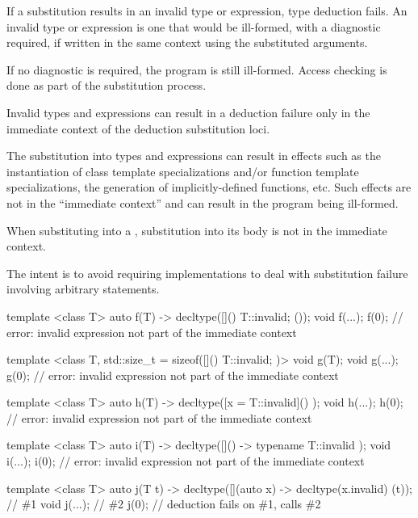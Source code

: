 \pnum
If a substitution results in an invalid type or expression, type deduction fails. An
invalid type or expression is one that would be ill-formed, with a diagnostic
required, if written in the same context using the substituted arguments.
\begin{note}
If no diagnostic is required, the program is still ill-formed.
Access checking is done as part of the substitution process.
\end{note}
Invalid types and expressions can result in a deduction failure
only in the immediate context of the deduction substitution loci.
\begin{note}
The substitution into types and expressions can result
in effects such as the instantiation of class template specializations and/or
function template specializations, the generation of implicitly-defined functions,
etc. Such effects are not in the ``immediate context'' and can result in the
program being ill-formed.
\end{note}

\pnum
When substituting into a ,
substitution into its body is not in the immediate context.
\begin{note}
The intent is to avoid requiring implementations to deal with
substitution failure involving arbitrary statements.
\begin{example}
\begin{codeblock}
template <class T>
  auto f(T) -> decltype([]() { T::invalid; } ());
void f(...);
f(0);               // error: invalid expression not part of the immediate context

template <class T, std::size_t = sizeof([]() { T::invalid; })>
  void g(T);
void g(...);
g(0);               // error: invalid expression not part of the immediate context

template <class T>
  auto h(T) -> decltype([x = T::invalid]() { });
void h(...);
h(0);               // error: invalid expression not part of the immediate context

template <class T>
  auto i(T) -> decltype([]() -> typename T::invalid { });
void i(...);
i(0);               // error: invalid expression not part of the immediate context

template <class T>
  auto j(T t) -> decltype([](auto x) -> decltype(x.invalid) { } (t));   // \#1
void j(...);                                                            // \#2
j(0);               // deduction fails on \#1, calls \#2
\end{codeblock}
\end{example}
\end{note}

